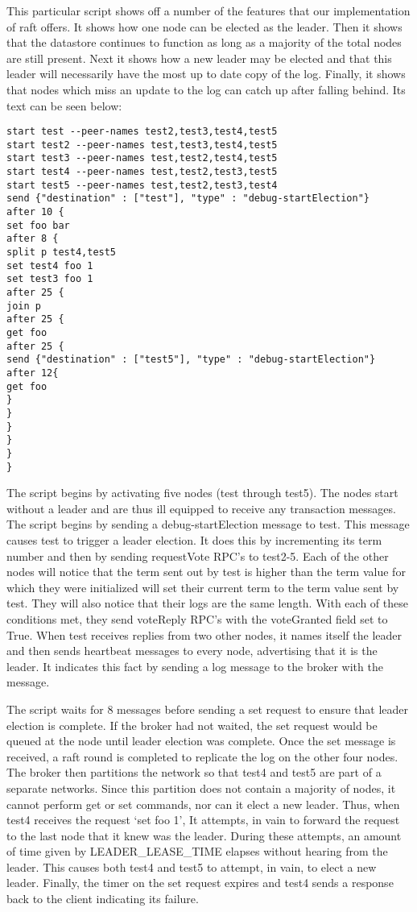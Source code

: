 \documentclass{article}
\begin{document}
This particular script shows off a number of the features that our implementation of raft offers. It shows how one node can be elected as the leader. Then it shows that the datastore continues to function as long as a majority of the total nodes are still present. Next it shows how a new leader may be elected and that this leader will necessarily have the most up to date copy of the log. Finally, it shows that nodes which miss an update to the log can catch up after falling behind. Its text can be seen below:
\begin{verbatim}
start test --peer-names test2,test3,test4,test5
start test2 --peer-names test,test3,test4,test5
start test3 --peer-names test,test2,test4,test5
start test4 --peer-names test,test2,test3,test5
start test5 --peer-names test,test2,test3,test4
send {"destination" : ["test"], "type" : "debug-startElection"}
after 10 {
set foo bar 
after 8 {
split p test4,test5
set test4 foo 1
set test3 foo 1
after 25 {
join p
after 25 {
get foo
after 25 {
send {"destination" : ["test5"], "type" : "debug-startElection"}
after 12{
get foo
}
}
}
}
}
}
\end{verbatim}

\newpage

The script begins by activating five nodes (test through test5). The nodes start without a leader and are thus ill equipped to receive any transaction messages. The script begins by sending a debug-startElection message to test. This message causes test to trigger a leader election. It does this by incrementing its term number and then by sending requestVote RPC’s to test2-5. Each of the other nodes will notice that the term sent out by test is higher than the term value for which they were initialized will set their current term to the term value sent by test. They will also notice that their logs are the same length. With each of these conditions met, they send voteReply RPC’s with the voteGranted field set to True. When test receives replies from two other nodes, it names itself the leader and then sends heartbeat messages to every node, advertising that it is the leader. It indicates this fact by sending a log message to the broker with the message.

The script waits for 8 messages before sending a set request to ensure that leader election is complete. If the broker had not waited, the set request would be queued at the node until leader election was complete. Once the set message is received, a raft round is completed to replicate the log on the other four nodes. The broker then partitions the network so that test4 and test5 are part of a separate networks. Since this partition does not contain a majority of nodes, it cannot perform get or set commands, nor can it elect a new leader. Thus, when test4 receives the request ‘set foo 1’, It attempts, in vain to forward the request to the last node that it knew was the leader. During these attempts, an amount of time given by LEADER\_LEASE\_TIME elapses without hearing from the leader. This causes both test4 and test5 to attempt, in vain, to elect a new leader. Finally, the timer on the set request expires and test4 sends a response back to the client indicating its failure.
\end{document}
